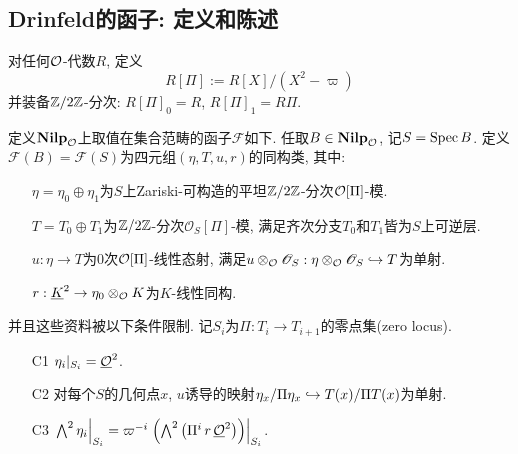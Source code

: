 \subsection{Drinfeld的函子: 定义和陈述}
对任何$\mathcal{O}$-代数$R$, 定义\[R[\Pi] := R[X]/(X^2-\varpi)\]
并装备$\mathbb{Z}/2\mathbb{Z}$-分次: $R[\Pi]_0 = R$, $R[\Pi]_1 = R\Pi$.
\begin{definition}\label{def: functor F}
    定义$\mathbf{Nilp}_{\mathcal{O}}$上取值在集合范畴的函子$\mathcal{F}$如下.
    任取$B\in\mathbf{Nilp}_{\mathcal{O}}$, 记$S = \operatorname{Spec} B$. 定义$\mathcal{F}(B) = \mathcal{F}(S)$为四元组$(\eta, T, u, r)$的同构类, 其中:\begin{enumerate}
        \item [\myit] $\eta = \eta_0\oplus\eta_1$为$S$上Zariski-可构造的平坦$\mathbb{Z}/2\mathbb{Z}$-分次$\mathcal{O}[\Pi]$-模.
        \item [\myit] $T = T_0\oplus T_1$为$\mathbb{Z}/2\mathbb{Z}$-分次$\mathscr{O}_S[\Pi]$-模, 满足齐次分支$T_0$和$T_1$皆为$S$上可逆层.
        \item [\myit] $u : \eta\to T$为$0$次$\mathcal{O}[\Pi]$-线性态射, 满足$u\otimes_{\mathcal{O}}\mathscr{O}_S : \eta\otimes_{\mathcal{O}}\mathscr{O}_S \hookrightarrow T$为单射.
        \item [\myit] $r : \underline{K}^2\to\eta_0\otimes_{\mathcal{O}} K$为$K$-线性同构.
    \end{enumerate}
    
    并且这些资料被以下条件限制. 记$S_i$为$\Pi : T_i\to T_{i+1}$的零点集(zero locus).\begin{enumerate}
        \item [C1] $\eta_i|_{S_i} = \underline{\mathcal{O}}^2$.
        \item [C2] 对每个$S$的几何点$x$, $u$诱导的映射$\eta_x/\Pi\eta_x\hookrightarrow T(x)/\Pi T(x)$为单射.
        \item [C3] $\left.\bigwedge^2\eta_i\right|_{S_i} = \varpi^{-i}\left.\left( \bigwedge^2 \left( \Pi^i\, r\, \underline{\mathcal{O}}^2 \right) \right)\right|_{S_i}$.
    \end{enumerate}
\end{definition}

